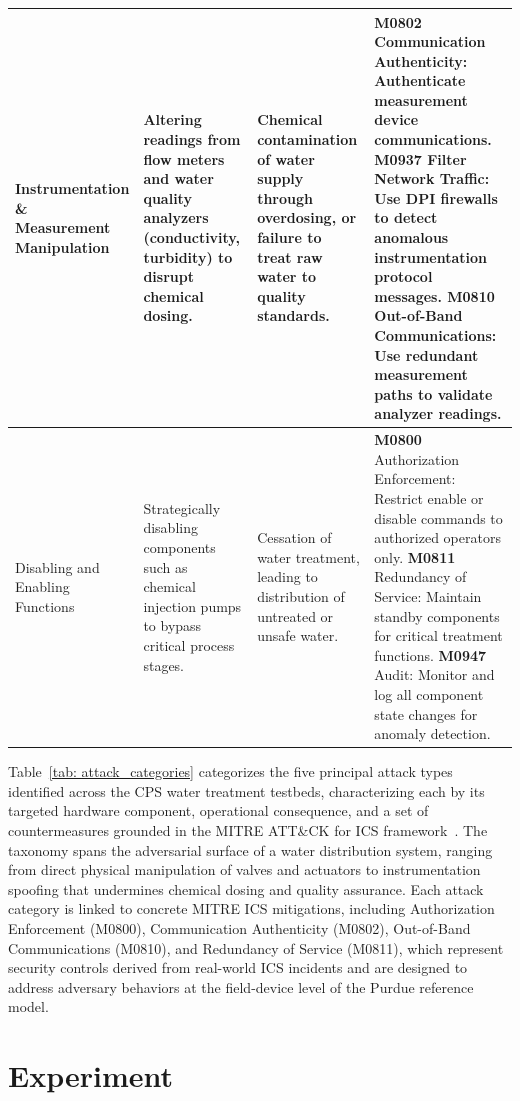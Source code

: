 \documentclass[pdflatex,sn-mathphys-num]{sn-jnl}
\theoremstyle{thmstyleone}
\theoremstyle{thmstyletwo}
\theoremstyle{thmstylethree}
\begin{document}
\begin{table}[!t]
{\begin{tabular}{|p{2.8cm}|p{3.5cm}|p{3.5cm}|p{8cm}|}
\makecell[l]{Instrumentation \& \\ Measurement \\ Manipulation}
& Altering readings from flow meters and water quality analyzers (conductivity, turbidity) to disrupt chemical dosing.
& Chemical contamination of water supply through overdosing, or failure to treat raw water to quality standards.
& \textbf{M0802} Communication Authenticity: Authenticate measurement device communications. \textbf{M0937} Filter Network Traffic: Use DPI firewalls to detect anomalous instrumentation protocol messages. \textbf{M0810} Out-of-Band Communications: Use redundant measurement paths to validate analyzer readings.\\
\hline

\makecell[l]{Disabling and \\ Enabling Functions}
& Strategically disabling components such as chemical injection pumps to bypass critical process stages.
& Cessation of water treatment, leading to distribution of untreated or unsafe water.
& \textbf{M0800} Authorization Enforcement: Restrict enable or disable commands to authorized operators only. \textbf{M0811} Redundancy of Service: Maintain standby components for critical treatment functions. \textbf{M0947} Audit: Monitor and log all component state changes for anomaly detection.\\
\hline

\end{tabular}
}
\end{table}
Table~\ref{tab: attack_categories} categorizes the five principal attack types identified across the CPS water treatment testbeds, characterizing each by its targeted hardware component, operational consequence, and a set of countermeasures grounded in the MITRE ATT\&CK for ICS framework~\cite{mitre_attack_ics}. The taxonomy spans the adversarial surface of a water distribution system, ranging from direct physical manipulation of valves and actuators to instrumentation spoofing that undermines chemical dosing and quality assurance. Each attack category is linked to concrete MITRE ICS mitigations, including Authorization Enforcement (M0800), Communication Authenticity (M0802), Out-of-Band Communications (M0810), and Redundancy of Service (M0811), which represent security controls derived from real-world ICS incidents and are designed to address adversary behaviors at the field-device level of the Purdue reference model.


\section{Experiment}
\end{document}
